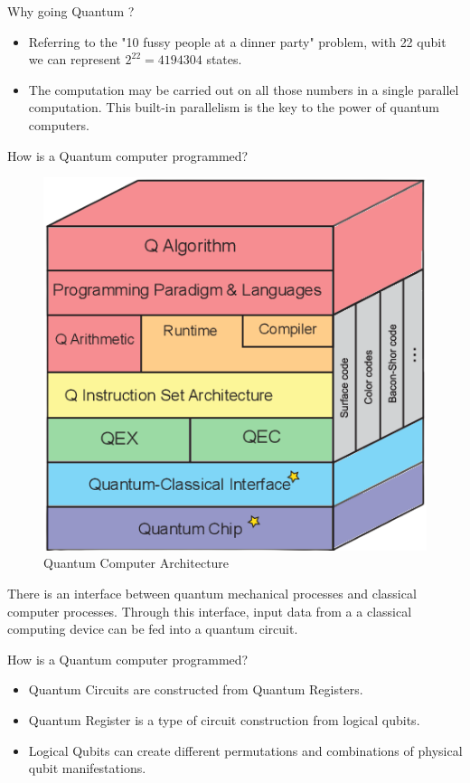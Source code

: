 \begin{frame}{Why going Quantum ?}
\begin{itemize}
 \item Referring to the "10 fussy people at a dinner party" problem, with \alert{22 qubit} we can represent $2^{22} = 4194304$ states.
    \item The computation may be carried out on all those numbers in a \alert{single parallel computation}. This built-in parallelism is the key to the power of quantum computers.
\end{itemize}
    
\end{frame}


\begin{frame}{How is a Quantum computer programmed?}
\begin{figure}[H]
    \centering
    \includegraphics[width=.4\linewidth]{ Hto8a.png}
    \caption{Quantum Computer Architecture}
\end{figure}
There is an \alert{interface} between quantum mechanical processes and classical computer processes. Through this interface, input data from a a classical computing device can be fed into a quantum circuit.
\end{frame}

\begin{frame}{How is a Quantum computer programmed?}
    \begin{itemize}
        \item \alert{Quantum Circuits} are constructed from Quantum Registers.
        \item \alert{Quantum Register} is a type of circuit construction from logical qubits. 
        \item \alert{Logical Qubits} can create different permutations and combinations of physical qubit manifestations.
    \end{itemize}
\end{frame}

